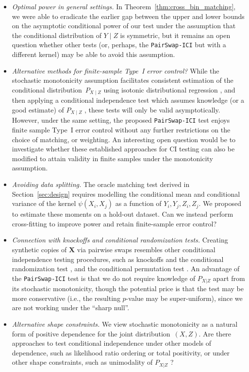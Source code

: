 \documentclass[12pt]{article}
\newcommand{\bX}{\mathbf{X}}
\begin{document}
\begin{itemize}
    \item \emph{Optimal power in general settings.} 
    In Theorem~\ref{thm:cross_bin_matching}, we were able to eradicate the earlier gap between the upper and lower bounds on the asymptotic conditional power of our test under the assumption that the conditional distribution of $Y\mid Z$ is symmetric, but it remains an open question whether other tests (or, perhaps, the \textnormal{\texttt{PairSwap-ICI}} but with a different kernel) may be able to avoid this assumption.
    \item \emph{Alternative methods for finite-sample Type~I error control?} While the stochastic monotonicity assumption facilitates consistent estimation of the conditional distribution~$P_{X\mid Z}$ using isotonic distributional regression \citep{mosching2020monotone,henzi2021isotonic}, and then applying a conditional independence test which assumes knowledge (or a good estimate) of $P_{X\mid Z}$ \citep{berrett2020conditional,candes2018panning}, these tests will only be valid asymptotically. However, under the same setting, the proposed \texttt{PairSwap-ICI} test enjoys finite sample Type~I error control without any further restrictions on the choice of matching, or weighting. An interesting open question would be to investigate whether these established approaches for CI testing can also be modified to attain validity in finite samples under the monotonicity assumption.
    \item \emph{Avoiding data splitting.} The oracle matching test derived in Section~\ref{sec:design} requires modelling the conditional mean and conditional variance of the kernel $\psi(X_i, X_j)$ as a function of $Y_i,Y_j,Z_i,Z_j$. We proposed to estimate these moments on a hold-out dataset. Can we instead perform cross-fitting to improve power and retain finite-sample error control? 
    \item \emph{Connection with knockoffs and conditional randomization tests.} Creating synthetic copies of $\bX$ via pairwise swaps resembles other conditional independence testing procedures, such as knockoffs and the conditional randomization test \citep{candes2018panning}, and the conditional permutation test \citep{berrett2020conditional}. An advantage of the \texttt{PairSwap-ICI} test is that we do not require knowledge of $P_{X|Z}$ apart from its stochastic monotonicity, though the potential price is that the test may be more conservative (i.e., the resulting $p$-value may be super-uniform), since we are not working under the ``sharp null''. 
    \item \emph{Alternative shape constraints.} We view stochastic monotonicity as a natural form of positive dependence for the joint distribution~$(X, Z)$. Are there approaches to test conditional independence under other models of dependence, such as likelihood ratio ordering or total positivity, or under other shape constraints, such as unimodality of $P_{X|Z}$ \citep{karlin1968total,shaked2007stochastic,mosching2024estimation}?
\end{itemize}
\end{document}
